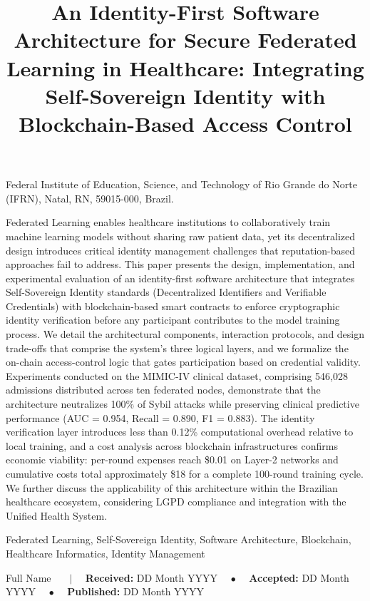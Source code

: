 \documentclass[english]{sbc2025}
\title[Architecture for Secure Federated Learning in Healthcare]{An Identity-First Software Architecture for Secure Federated Learning in Healthcare: Integrating Self-Sovereign Identity with Blockchain-Based Access Control}
\author[Tertulino, 2026]{

\affil{\textbf{Rodrigo Tertulino}~\orcidlink{0000-0002-7594-9312}~\textcolor{blue}{\faEnvelopeO}~~[~{Federal Institute of Rio Grande do Norte (IFRN)}~|\href{mailto:rodrigo.tertulino@ifrn.edu.br}{~{\textit{rodrigo.tertulino@ifrn.edu.br}}}~]}

}
\begin{document}
\begin{frontmatter}
\maketitle

\begin{mail}
Federal Institute of Education, Science, and Technology of Rio Grande do Norte (IFRN), Natal, RN, 59015-000, Brazil.
\end{mail}

\begin{abstract-en}
Federated Learning enables healthcare institutions to collaboratively train machine learning models without sharing raw patient data, yet its decentralized design introduces critical identity management challenges that reputation-based approaches fail to address. This paper presents the design, implementation, and experimental evaluation of an identity-first software architecture that integrates Self-Sovereign Identity standards (Decentralized Identifiers and Verifiable Credentials) with blockchain-based smart contracts to enforce cryptographic identity verification before any participant contributes to the model training process. We detail the architectural components, interaction protocols, and design trade-offs that comprise the system's three logical layers, and we formalize the on-chain access-control logic that gates participation based on credential validity. Experiments conducted on the MIMIC-IV clinical dataset, comprising 546,028 admissions distributed across ten federated nodes, demonstrate that the architecture neutralizes 100\% of Sybil attacks while preserving clinical predictive performance (AUC = 0.954, Recall = 0.890, F1 = 0.883). The identity verification layer introduces less than 0.12\% computational overhead relative to local training, and a cost analysis across blockchain infrastructures confirms economic viability: per-round expenses reach \$0.01 on Layer-2 networks and cumulative costs total approximately \$18 for a complete 100-round training cycle. We further discuss the applicability of this architecture within the Brazilian healthcare ecosystem, considering LGPD compliance and integration with the Unified Health System.
\end{abstract-en}

\begin{keywords}
Federated Learning, Self-Sovereign Identity, Software Architecture, Blockchain, Healthcare Informatics, Identity Management
\end{keywords}

\begin{dates}
Full Name~
~~$\mid$~~ 
{\sffamily\textbf{Received:}} DD Month YYYY
~~$\bullet$~~
{\sffamily\textbf{Accepted:}} DD Month YYYY
~~$\bullet$~~
{\sffamily\textbf{Published:}} DD Month YYYY
\end{dates}

\end{frontmatter}
\end{document}

